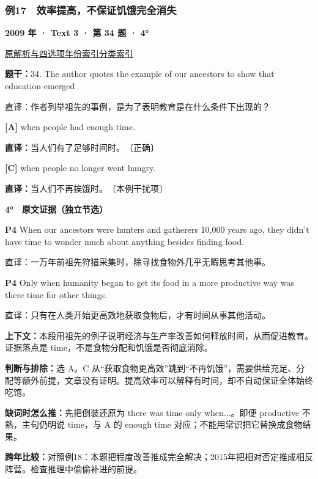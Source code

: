 \documentclass[11pt,a4paper]{article}
\begin{document}
\subsubsection{例17　效率提高，不保证饥饿完全消失}\label{case-2009-T3-Q34}
\noindent\textbf{2009 年 · Text 3 · 第 34 题 · 4°}\par\noindent \href{https://zj139.github.io/math-notes/english/218135c1190c9ac029fd9ef3/\#q34}{原解析与四选项}\quad \hyperref[idx-2009-T3-Q34]{年份索引}\quad \hyperref[class-R09]{分类索引}\par\smallskip
\noindent\textbf{题干：}34. The author quotes the example of our ancestors to show that education emerged\par
直译：作者列举祖先的事例，是为了表明教育是在什么条件下出现的？\par
{}\noindent\textbf{[A]} when people had enough time.\par\nopagebreak
\noindent\textbf{直译：}当人们有了足够时间时。　〔正确〕\par
{}\noindent\textbf{[C]} when people no longer went hungry.\par\nopagebreak
\noindent\textbf{直译：}当人们不再挨饿时。　〔本例干扰项〕\par
\begin{evidence}\textbf{4°　原文证据（独立节选）}\par
\textbf{P4} When our ancestors were hunters and gatherers 10,000 years ago, they didn't have time to wonder much about anything besides finding food.\par 直译：一万年前祖先狩猎采集时，除寻找食物外几乎无暇思考其他事。\par
\textbf{P4} Only when humanity began to get its food in a more productive way was there time for other things.\par 直译：只有在人类开始更高效地获取食物后，才有时间从事其他活动。\par
\end{evidence}
\noindent\textbf{上下文：}本段用祖先的例子说明经济与生产率改善如何释放时间，从而促进教育。证据落点是 time，不是食物分配和饥饿是否彻底消除。\par
\noindent\textbf{判断与排除：}选 A。C 从“获取食物更高效”跳到“不再饥饿”，需要供给充足、分配等额外前提，文章没有证明。提高效率可以解释有时间，却不自动保证全体始终吃饱。\par
\noindent\textbf{缺词时怎么推：}先把倒装还原为 there was time only when...。即便 productive 不熟，主句仍明说 time，与 A 的 enough time 对应；不能用常识把它替换成食物结果。\par
\noindent\textbf{跨年比较：}对照例18：本题把程度改善推成完全解决；2015年把相对否定推成相反阵营。检查推理中偷偷补进的前提。\par
\clearpage
\end{document}
